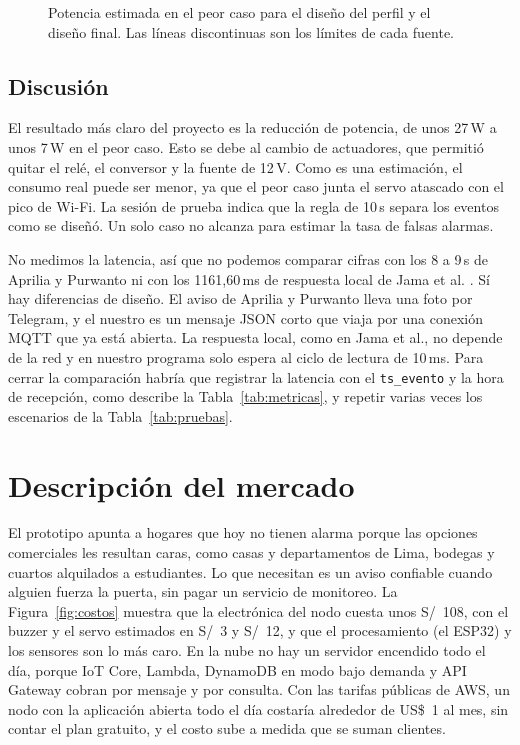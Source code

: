 \documentclass[manuscript,screen,nonacm]{acmart}
\begin{document}
\begin{figure}[htbp]
\centering

\caption{Potencia estimada en el peor caso para el diseño del perfil y el diseño final. Las líneas discontinuas son los límites de cada fuente.}
\label{fig:corriente}
\end{figure}

\subsection{Discusión}
El resultado más claro del proyecto es la reducción de potencia, de unos 27\,W a unos 7\,W en el peor caso. Esto se debe al cambio de actuadores, que permitió quitar el relé, el conversor y la fuente de 12\,V. Como es una estimación, el consumo real puede ser menor, ya que el peor caso junta el servo atascado con el pico de Wi-Fi. La sesión de prueba indica que la regla de 10\,s separa los eventos como se diseñó. Un solo caso no alcanza para estimar la tasa de falsas alarmas.

No medimos la latencia, así que no podemos comparar cifras con los 8 a 9\,s de Aprilia y Purwanto \cite{aprilia2025boarding} ni con los 1161,60\,ms de respuesta local de Jama et al. \cite{jama2026edge}. Sí hay diferencias de diseño. El aviso de Aprilia y Purwanto lleva una foto por Telegram, y el nuestro es un mensaje JSON corto que viaja por una conexión MQTT que ya está abierta. La respuesta local, como en Jama et al., no depende de la red y en nuestro programa solo espera al ciclo de lectura de 10\,ms. Para cerrar la comparación habría que registrar la latencia con el \texttt{ts\_evento} y la hora de recepción, como describe la Tabla~\ref{tab:metricas}, y repetir varias veces los escenarios de la Tabla~\ref{tab:pruebas}.

\section{Descripción del mercado}
\label{sec:mercado}

El prototipo apunta a hogares que hoy no tienen alarma porque las opciones comerciales les resultan caras, como casas y departamentos de Lima, bodegas y cuartos alquilados a estudiantes. Lo que necesitan es un aviso confiable cuando alguien fuerza la puerta, sin pagar un servicio de monitoreo. La Figura~\ref{fig:costos} muestra que la electrónica del nodo cuesta unos S/~108, con el buzzer y el servo estimados en S/~3 y S/~12, y que el procesamiento (el ESP32) y los sensores son lo más caro. En la nube no hay un servidor encendido todo el día, porque IoT Core, Lambda, DynamoDB en modo bajo demanda y API Gateway cobran por mensaje y por consulta. Con las tarifas públicas de AWS, un nodo con la aplicación abierta todo el día costaría alrededor de US\$~1 al mes, sin contar el plan gratuito, y el costo sube a medida que se suman clientes.
\end{document}
